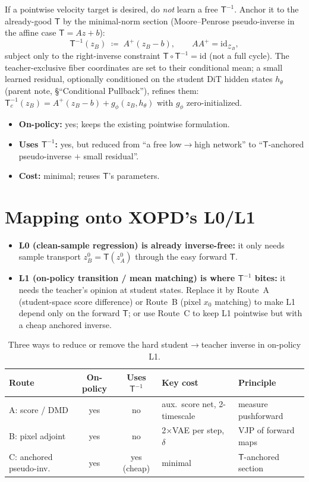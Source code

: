 \documentclass[11pt,a4paper]{article}
\newcommand{\Zb}{\mathcal{Z}_{B}}
\newcommand{\Tmap}{\mathsf{T}}
\newcommand{\Tinv}{\mathsf{T}^{-1}}
\theoremstyle{definition}
\begin{document}
If a pointwise velocity target is desired, do \emph{not} learn a free $\Tinv$. Anchor it to the
already-good $\Tmap$ by the minimal-norm section (Moore--Penrose pseudo-inverse in the affine
case $\Tmap=Az+b$):
\begin{equation}
\Tinv(z_B)\;\coloneqq\;A^{+}(z_B-b),
\qquad A A^{+}=\mathrm{id}_{\Zb},
\label{eq:pinv}
\end{equation}
subject only to the right-inverse constraint $\Tmap\circ\Tinv=\mathrm{id}$ (not a full cycle).
The teacher-exclusive fiber coordinates are set to their conditional mean; a small learned
residual, optionally conditioned on the student DiT hidden states $h_\theta$ (parent note,
\S ``Conditional Pullback''), refines them:
$\Tinv_c(z_B)=A^{+}(z_B-b)+g_\phi(z_B,h_\theta)$ with $g_\phi$ zero-initialized.
\begin{itemize}[leftmargin=1.4em,itemsep=2pt]
  \item \textbf{On-policy:} yes; keeps the existing pointwise formulation.
  \item \textbf{Uses $\Tinv$:} yes, but reduced from ``a free low$\to$high network'' to
        ``$\Tmap$-anchored pseudo-inverse $+$ small residual''.
  \item \textbf{Cost:} minimal; reuses $\Tmap$'s parameters.
\end{itemize}

\section{Mapping onto XOPD's L0/L1}
\label{sec:l0l1}

\begin{itemize}[leftmargin=1.4em,itemsep=3pt]
  \item \textbf{L0 (clean-sample regression) is already inverse-free:} it only needs sample
        transport $z_B^0=\Tmap(z_A^0)$ through the easy forward $\Tmap$.
  \item \textbf{L1 (on-policy transition / mean matching) is where $\Tinv$ bites:} it needs the
        teacher's opinion at student states. Replace it by Route~A (student-space score
        difference) or Route~B (pixel $x_0$ matching) to make L1 depend only on the forward
        $\Tmap$; or use Route~C to keep L1 pointwise but with a cheap anchored inverse.
\end{itemize}

\begin{table}[h]
\centering
\small
\begin{tabular}{lccll}
\toprule
Route & On-policy & Uses $\Tinv$ & Key cost & Principle \\
\midrule
A: score / DMD          & yes & no  & aux.\ score net, 2-timescale & measure pushforward \\
B: pixel adjoint        & yes & no  & 2$\times$VAE per step, $\delta$ & VJP of forward maps \\
C: anchored pseudo-inv. & yes & yes (cheap) & minimal & $\Tmap$-anchored section \\
\bottomrule
\end{tabular}
\caption{Three ways to reduce or remove the hard student$\to$teacher inverse in on-policy L1.}
\end{table}
\end{document}

